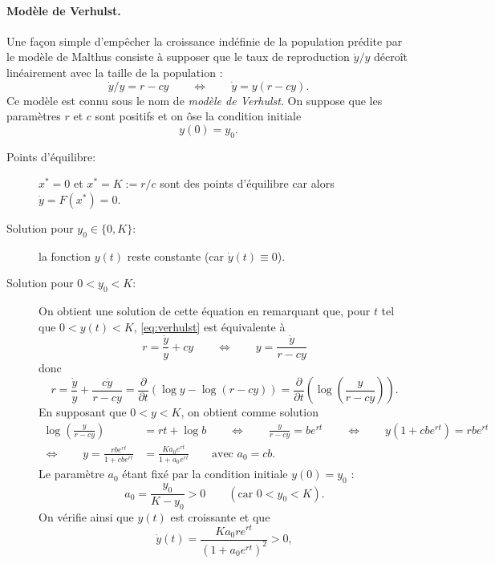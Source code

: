 \paragraph*{Modèle de Verhulst.}
Une façon simple d'empêcher la croissance indéfinie de la population prédite par le modèle de Malthus consiste à supposer que le taux de reproduction $\dot y / y$ décroît linéairement avec la taille de la population : 
\begin{equation} \label{eq:verhulst}
\dot y / y = r - cy
\qquad \Leftrightarrow \qquad
\dot y = y(r - cy).
\end{equation}
Ce modèle est connu sous le nom de {\em modèle de Verhulst}. On suppose que les paramètres $r$ et $c$ sont positifs et on ôse la condition initiale
$$
y(0) = y_0.
$$
\begin{description}
  \item[Points d'équilibre:] $x^* = 0$ et $x^* = K := r/c$ sont des points d'équilibre car alors $\dot y = F(x^*) = 0$.
  \item[Solution pour $y_0 \in \{0, K\}$:] la fonction $y(t)$ reste constante (car $\dot y(t) \equiv 0$).
  \item[Solution pour $0 < y_0 < K$:]
  On obtient une solution de cette équation en remarquant que, pour $t$ tel que $0 < y(t) < K$, \eqref{eq:verhulst} est équivalente à 
  $$
  r = \frac{\dot y}y + cy \qquad \Leftrightarrow \qquad y = \frac{\dot y}{r - cy}
  $$
  donc
  \begin{equation} \label{eq:verhulstSolution}
  r 
  = \frac{\dot y}{y} + \frac{c \dot y}{r - cy}
  = \frac{\partial}{\partial t} \left(\log y - \log (r - cy) \right)
  = \frac{\partial}{\partial t} \left(\log \left(\frac{y}{r - cy}\right)\right).
  \end{equation}
  En supposant que $0 < y < K$, on obtient comme solution 
  \begin{align*}
    \log \left(\frac{y}{r - cy}\right) & = rt + \log b
    \qquad \Leftrightarrow \qquad 
    \frac{y}{r - cy} = b e^{rt}
    \qquad \Leftrightarrow \qquad
    y(1 + c b e^{rt}) = r b e^{rt} \\
    \Leftrightarrow \qquad 
    y = \frac{rb e^{rt}}{1 + cb e^{rt}} & = \frac{K a_0 e^{rt}}{1 + a_0 e^{rt}}
    \qquad \text{avec } a_0 = cb.
  \end{align*}
  Le paramètre $a_0$ étant fixé par la condition initiale $y(0) = y_0$ : 
  $$
  a_0 = \frac{y_0}{K-y_0} > 0 \qquad (\text{car } 0  < y_0 < K).
  $$
  On vérifie ainsi que $y(t)$ est croissante et que 
  $$
  \dot y(t) = \frac{Ka_0 r e^{rt}}{(1 + a_0 e^{rt})^2} > 0, 
$$
\end{description}
